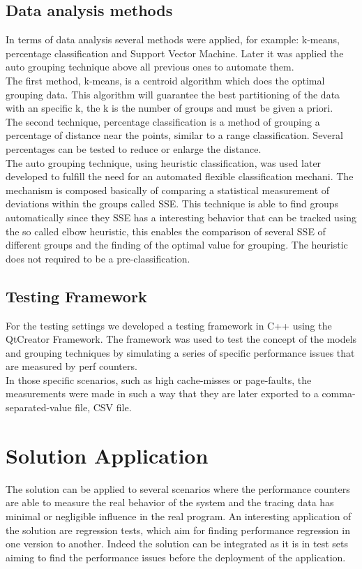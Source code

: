 \subsection{Data analysis methods}
In terms of data analysis several methods were applied, for example: k-means, percentage classification and Support Vector Machine. Later it was applied the auto grouping technique above all previous ones to automate them.\\
The first method, k-means, is a centroid algorithm which does the optimal grouping data. This algorithm will guarantee the best partitioning of the data with an specific k, the k is the number of groups and must be given a priori.\\
The second technique, percentage classification is a method of grouping a percentage of distance near the points, similar to a range classification. Several percentages can be tested to reduce or enlarge the distance.\\
The auto grouping technique, using heuristic classification, was used later developed to fulfill the need for an automated flexible classification mechani. The mechanism is composed basically of comparing a statistical measurement of deviations within the groups called SSE. This technique is able to find groups automatically since they SSE has a interesting behavior that can be tracked using the so called elbow heuristic, this enables the comparison of several SSE of different groups and the finding of the optimal value for grouping. The heuristic does not required to be a pre-classification.
\subsection{Testing Framework}
For the testing settings we developed a testing framework in C++ using the QtCreator Framework. The framework was used to test the concept of the models and grouping techniques by simulating a series of specific performance issues that are measured by perf counters.\\
In those specific scenarios, such as high cache-misses or page-faults, the measurements were made in such a way that they are later exported to a comma-separated-value file, CSV file.
\section{Solution Application}
The solution can be applied to several scenarios where the performance counters are able to measure the real behavior of the system and the tracing data has minimal or negligible influence in the real program.
An interesting application of the solution are regression tests, which aim for finding performance regression in one version to another. Indeed the solution can be integrated as it is in test sets aiming to find the performance issues before the deployment of the application.
